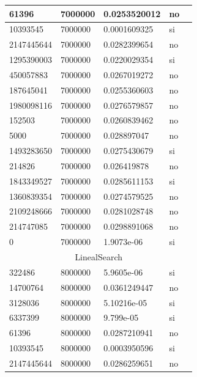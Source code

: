 \documentclass[12pt, fleqn]{article}                             %
\theoremstyle{break}                                            %
\begin{document}
\begin{longtable}{|m{5em}|m{5em}|m{10em}|m{5em}|@{}m{0pt}@{}}
            61396& 7000000  & 0.0253520012 & no &\\[1em]    \hline
            10393545& 7000000  & 0.0001609325 & si &\\[1em]    \hline
            2147445644& 7000000  & 0.0282399654 & no &\\[1em]    \hline
            1295390003& 7000000  & 0.0220029354 & si &\\[1em]    \hline
            450057883& 7000000  & 0.0267019272 & no &\\[1em]    \hline
            187645041& 7000000  & 0.0255360603 & no &\\[1em]    \hline
            1980098116& 7000000  & 0.0276579857 & no &\\[1em]    \hline
            152503& 7000000  & 0.0260839462 & no &\\[1em]    \hline
            5000& 7000000  & 0.028897047 & no &\\[1em]    \hline
            1493283650& 7000000  & 0.0275430679 & si &\\[1em]    \hline
            214826& 7000000  & 0.026419878 & no &\\[1em]    \hline
            1843349527& 7000000  & 0.0285611153 & si &\\[1em]    \hline
            1360839354& 7000000  & 0.0274579525 & no &\\[1em]    \hline
            2109248666& 7000000  & 0.0281028748 & no &\\[1em]    \hline
            214747085& 7000000  & 0.0298891068 & no &\\[1em]    \hline
            0& 7000000  & 1.9073e-06 & si &\\[1em]    \hline
            \multicolumn{5}{|c|}{LinealSearch}   \\          \hline
            322486& 8000000  & 5.9605e-06 & si &\\[1em]    \hline
            14700764& 8000000  & 0.0361249447 & no &\\[1em]    \hline
            3128036& 8000000  & 5.10216e-05 & si &\\[1em]    \hline
            6337399& 8000000  & 9.799e-05 & si &\\[1em]    \hline
            61396& 8000000  & 0.0287210941 & no &\\[1em]    \hline
            10393545& 8000000  & 0.0003950596 & si &\\[1em]    \hline
            2147445644& 8000000  & 0.0286259651 & no &\\[1em]    \hline

\end{longtable}
\end{document}
